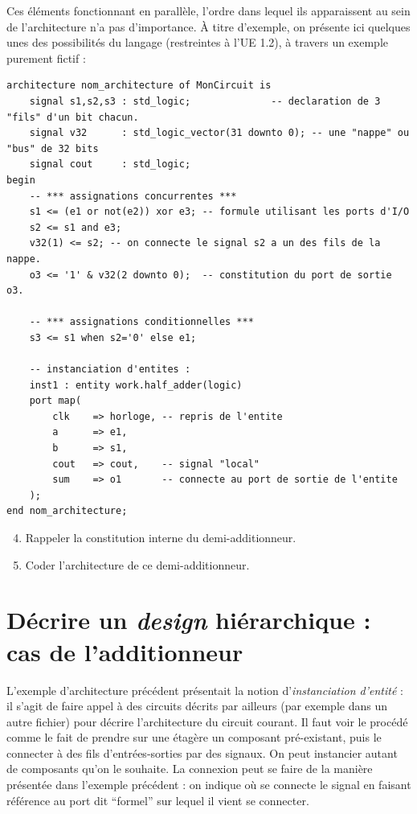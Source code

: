 \documentclass[a4paper,11pt]{article}
\begin{document}
Ces éléments fonctionnant en parallèle, l'ordre dans lequel ils apparaissent au sein de l'architecture n'a pas d'importance. À titre d'exemple, on présente ici quelques unes des possibilités du langage (restreintes à l'UE 1.2), à travers un exemple purement fictif :

\begin{lstlisting}[style=vhdlstyle]
architecture nom_architecture of MonCircuit is
    signal s1,s2,s3 : std_logic;              -- declaration de 3 "fils" d'un bit chacun.
    signal v32      : std_logic_vector(31 downto 0); -- une "nappe" ou "bus" de 32 bits
    signal cout     : std_logic;
begin
    -- *** assignations concurrentes ***
    s1 <= (e1 or not(e2)) xor e3; -- formule utilisant les ports d'I/O
    s2 <= s1 and e3;
    v32(1) <= s2; -- on connecte le signal s2 a un des fils de la nappe.
    o3 <= '1' & v32(2 downto 0);  -- constitution du port de sortie o3.

    -- *** assignations conditionnelles ***
    s3 <= s1 when s2='0' else e1;

    -- instanciation d'entites :
    inst1 : entity work.half_adder(logic)
    port map(
        clk    => horloge, -- repris de l'entite
        a      => e1,
        b      => s1,
        cout   => cout,    -- signal "local"
        sum    => o1       -- connecte au port de sortie de l'entite
    );
end nom_architecture;
\end{lstlisting}

\begin{questionbox}
\begin{enumerate}
    \setcounter{enumi}{3}
    \item Rappeler la constitution interne du demi-additionneur.
    \item Coder l'architecture de ce demi-additionneur.
\end{enumerate}
\end{questionbox}

\section{Décrire un \textit{design} hiérarchique : cas de l'additionneur}

L'exemple d'architecture précédent présentait la notion d'\textit{instanciation d'entité} : il s'agit de faire appel à des circuits décrits par ailleurs (par exemple dans un autre fichier) pour décrire l'architecture du circuit courant. Il faut voir le procédé comme le fait de prendre sur une étagère un composant pré-existant, puis le connecter à des fils d'entrées-sorties par des signaux. On peut instancier autant de composants qu'on le souhaite. La connexion peut se faire de la manière présentée dans l'exemple précédent : on indique où se connecte le signal en faisant référence au port dit ``formel'' sur lequel il vient se connecter.
\end{document}
